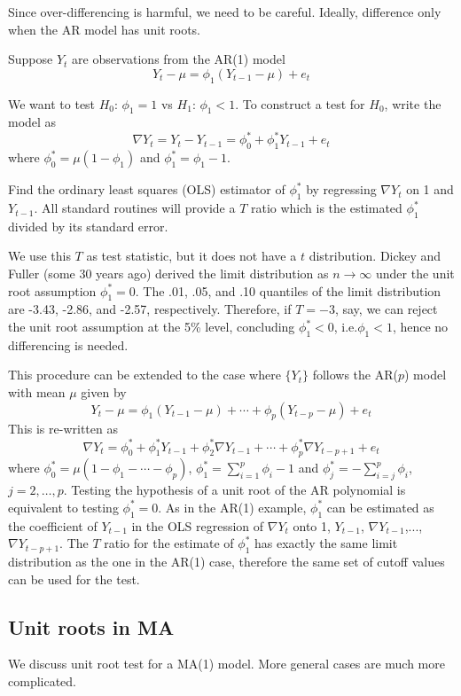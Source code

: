\documentclass[12pt]{article}
\begin{document}
\begin{enumerate}
Since over-differencing is harmful,
we need to be careful.
Ideally, difference only when the AR model has unit roots.

Suppose $Y_t$ are observations from the AR(1) model
\[
Y_t - \mu = \phi_1(Y_{t-1} - \mu) + e_t
\]

We want to test
$H_0$: $\phi_1 = 1$ vs $H_1$: $\phi_1 < 1$.
To construct a test for $H_0$,
write the model as
\[
\nabla Y_t
= Y_t - Y_{t-1}
= \phi_0^* + \phi_1^* Y_{t-1} + e_t
\]
where
$\phi_0^* = \mu(1-\phi_1)$ and
$\phi_1^* = \phi_1 - 1$.

Find the ordinary least squares (OLS) estimator of $\phi_1^*$
by regressing $\nabla Y_t$ on 1 and $Y_{t-1}$.
All standard routines will provide a $T$ ratio which is
the estimated $\phi_1^*$ divided by its standard error.

We use this $T$ as test statistic, but it does not have a $t$
distribution.
Dickey and Fuller (some 30 years ago) derived the limit distribution as
$n \rightarrow \infty$ under the unit root assumption
$\phi_1^* = 0$.
The .01, .05, and .10 quantiles of the limit distribution
are -3.43, -2.86, and -2.57, respectively.
Therefore, if $T = -3$, say,
we can reject the unit root assumption at the 5\% level,
concluding $\phi_1^* < 0$, i.e.\@ $\phi_1 < 1$,
hence no differencing is needed.

This procedure can be extended to the case where $\{Y_t\}$ follows
the AR($p$) model with mean $\mu$ given by
\[
Y_t - \mu = \phi_1(Y_{t-1} - \mu) +\dotsb + \phi_p(Y_{t-p} - \mu) + e_t
\]
This is re-written as
\[
\nabla Y_t
= \phi_0^* + \phi_1^* Y_{t-1} + \phi_2^* \nabla Y_{t-1} +\dotsb+
    \phi_p^* \nabla Y_{t-p+1} + e_t
\]
where
$\phi_0^* = \mu(1 - \phi_1 -\dotsb - \phi_p)$,
$\phi_1^* = \sum_{i=1}^p \phi_i - 1$
and
$\phi_j^* = -\sum_{i=j}^p \phi_i$,
$j=2,\dotsc,p$.
Testing the hypothesis of a unit root of the AR polynomial is equivalent
to testing $\phi_1^* = 0$.
As in the AR(1) example,
$\phi_1^*$ can be estimated as the coefficient of $Y_{t-1}$
in the OLS regression of $\nabla Y_t$ onto
1, $Y_{t-1}$, $\nabla Y_{t-1}$,..., $\nabla Y_{t-p+1}$.
The $T$ ratio for the estimate of $\phi_1^*$ has exactly the same limit
distribution as the one in the AR(1) case,
therefore the same set of cutoff values can be used for the test.

\subsection{Unit roots in MA}

We discuss unit root test for a MA(1) model.
More general cases are much more complicated.



\end{enumerate}
\end{document}
